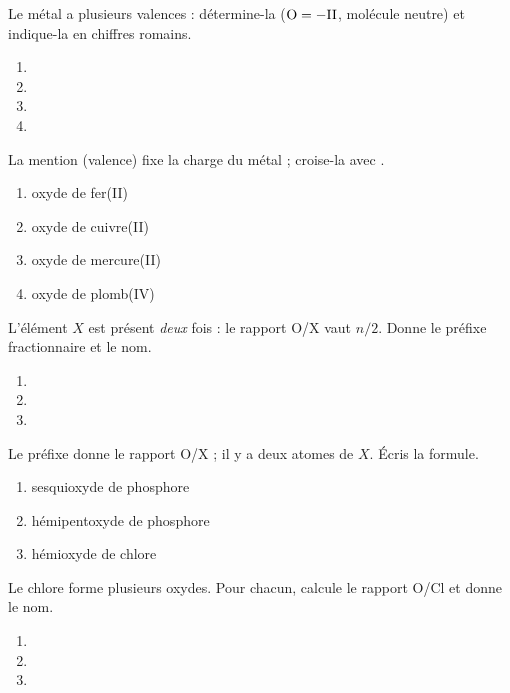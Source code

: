\documentclass[11pt,a4paper]{article}
\begin{document}
\begin{exo}
Le métal a plusieurs valences : détermine-la ($\ce{O}=-\mathrm{II}$, molécule neutre) et indique-la en
chiffres romains.
\begin{enumerate}[label=\alph*)]
  \item {}
  \item {}
  \item {}
  \item {}
\end{enumerate}
\end{exo}

\begin{exo}
La mention (valence) fixe la charge du métal ; croise-la avec .
\begin{enumerate}[label=\alph*)]
  \item oxyde de fer(II)
  \item oxyde de cuivre(II)
  \item oxyde de mercure(II)
  \item oxyde de plomb(IV)
\end{enumerate}
\end{exo}

\begin{exo}
L'élément $X$ est présent \emph{deux} fois : le rapport O/X vaut $n/2$. Donne le préfixe fractionnaire et
le nom.
\begin{enumerate}[label=\alph*)]
  \item {}
  \item {}
  \item {}
\end{enumerate}
\end{exo}

\begin{exo}
Le préfixe donne le rapport O/X ; il y a deux atomes de $X$. Écris la formule.
\begin{enumerate}[label=\alph*)]
  \item sesquioxyde de phosphore
  \item hémipentoxyde de phosphore
  \item hémioxyde de chlore
\end{enumerate}
\end{exo}

\begin{exo}
Le chlore forme plusieurs oxydes. Pour chacun, calcule le rapport O/Cl et donne le nom.
\begin{enumerate}[label=\alph*)]
  \item {}
  \item {}
  \item {}
\end{enumerate}
\end{exo}
\end{document}

